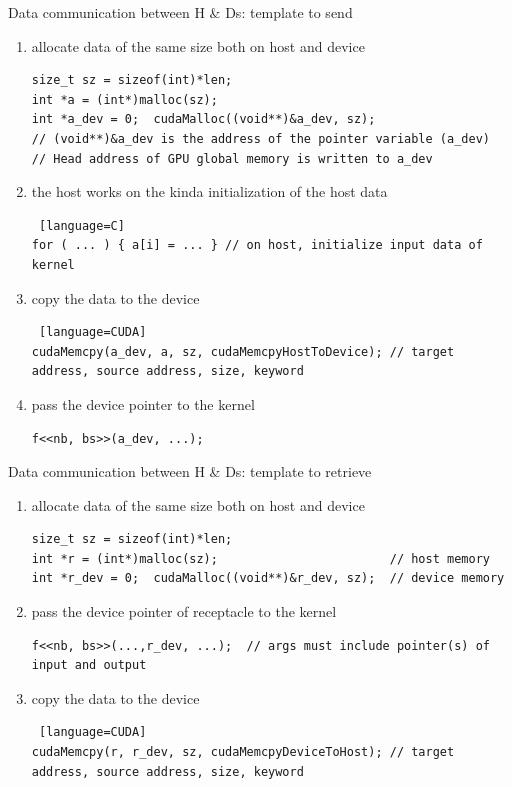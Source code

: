 \documentclass[dvipdfmx, 11pt, aspectratio=169]{beamer}   %
\begin{document}
\begin{frame}[fragile]{Data communication between H \& Ds: template to send}
  \begin{enumerate}[<+->]
    \item allocate data of the same size both on host and device
\begin{lstlisting}[language=CUDA]
size_t sz = sizeof(int)*len;
int *a = (int*)malloc(sz);
int *a_dev = 0;  cudaMalloc((void**)&a_dev, sz);
// (void**)&a_dev is the address of the pointer variable (a_dev)
// Head address of GPU global memory is written to a_dev
\end{lstlisting}
    \item the host works on the kinda initialization of the host data
\begin{lstlisting} [language=C]
for ( ... ) { a[i] = ... } // on host, initialize input data of kernel
\end{lstlisting}
    \item copy the data to the device
\begin{lstlisting} [language=CUDA]
cudaMemcpy(a_dev, a, sz, cudaMemcpyHostToDevice); // target address, source address, size, keyword
\end{lstlisting}
    \item pass the device pointer to the kernel
\begin{lstlisting}[language=CUDA]
f<<nb, bs>>(a_dev, ...);
\end{lstlisting}
    \end{enumerate}
\end{frame}
\begin{frame}[fragile]{Data communication between H \& Ds: template to retrieve}
  \begin{enumerate}[<+->]
    \item allocate data of the same size both on host and device
\begin{lstlisting}[language=CUDA]
size_t sz = sizeof(int)*len;
int *r = (int*)malloc(sz);                        // host memory
int *r_dev = 0;  cudaMalloc((void**)&r_dev, sz);  // device memory
\end{lstlisting}
    \item pass the device pointer of receptacle to the kernel
\begin{lstlisting}[language=CUDA]
f<<nb, bs>>(...,r_dev, ...);  // args must include pointer(s) of input and output
\end{lstlisting}
    \item copy the data to the device
\begin{lstlisting} [language=CUDA]
cudaMemcpy(r, r_dev, sz, cudaMemcpyDeviceToHost); // target address, source address, size, keyword
\end{lstlisting}
    \end{enumerate}
\end{frame}
\end{document}
